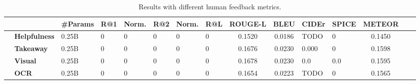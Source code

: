 \begin{table}[t!]
\centering
\renewcommand{\arraystretch}{1.1} 
\small
\begin{tabularx}{\linewidth}{l l H HH HH Hc cH Hccc}
\toprule
&
& 
\textbf{\#Params} & 
R@1 & \sc Norm. & %
R@2 & \sc Norm. & %
R@L & 
\textbf{ROUGE-L} &
\textbf{BLEU} & 
\textbf{CIDEr} & 
\textbf{SPICE} &
\textbf{METEOR} &
\\ \midrule

& \textbf{Helpfulness} & 0.25B & 0 & 0 & 0 & 0 & 0 & 0.1520 & 0.0186 & TODO &  0 & 0.1450 \\ 
& \textbf{Takeaway} & 0.25B & 0 & 0 & 0 & 0 & 0 &   0.1676 &  0.0230 & 0.000  & 0 & 0.1598 \\ 
& \textbf{Visual} & 0.25B & 0 & 0 & 0 & 0 & 0 &  0.1678 &  0.0230 & 0.0  & 0.0 & 0.1595 \\ 
& \textbf{OCR} & 0.25B & 0 & 0 & 0 & 0 & 0 & 0.1654 & 0.0223 & TODO &  0 & 0.1565 \\ 


\bottomrule
\end{tabularx}
\vspace{-1mm}
\caption{%
Results with different human feedback metrics.
}
\label{table:results-comparison-metrics}
\vspace{-3mm}
\end{table}






